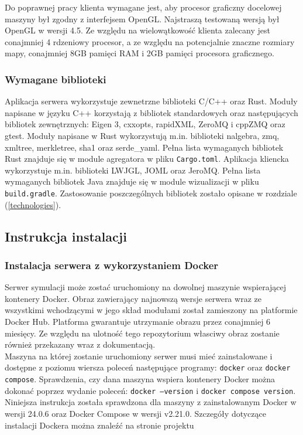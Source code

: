 \documentclass[15pt]{sprawozdanie}
\begin{document}
Do poprawnej pracy klienta wymagane jest, aby procesor graficzny docelowej maszyny był zgodny z interfejsem OpenGL. Najstraszą testowaną wersją był OpenGL w wersji 4.5. Ze względu na wielowątkowość klienta zalecany jest conajmniej 4 rdzeniowy procesor, a ze względu na potencjalnie znaczne rozmiary mapy, conajmniej 8GB pamięci RAM i 2GB pamięci procesora graficznego.

\subsubsection{Wymagane biblioteki} \label{libraries}

Aplikacja serwera wykorzystuje zewnetrzne biblioteki C/C++ oraz Rust. Moduły napisane w języku C++ korzystają z bibliotek standardowych oraz następujących bibliotek zewnętrznych: Eigen 3, cxxopts, rapidXML, ZeroMQ i cppZMQ oraz gtest.
Moduły napisane w Rust wykorzystują m.in. biblioteki nalgebra, zmq, xmltree, merkletree, sha1 oraz serde\_yaml. Pełna lista wymaganych bibliotek Rust znajduje się w module agregatora w pliku \texttt{Cargo.toml}.
Aplikacja kliencka wykorzystuje m.in. biblioteki LWJGL, JOML oraz JeroMQ. Pełna lista wymaganych bibliotek Java znajduje się w module wizualizacji w pliku \texttt{build.gradle}.  Zastosowanie poszczególnych bibliotek zostało opisane w rozdziale (\ref{technologies}).



\subsection{Instrukcja instalacji}
\subsubsection{Instalacja serwera z wykorzystaniem Docker} \label{docker_server}

Serwer symulacji może zostać uruchomiony na dowolnej maszynie wspierającej kontenery Docker. Obraz zawierający najnowszą wersje serwera wraz ze wszystkimi wchodzącymi w jego skład modułami został zamieszony na platformie Docker Hub. Platforma gwarantuje utrzymanie obrazu przez conajmniej 6 miesięcy. Ze względu na ulotność tego repozytorium własciwy obraz zostanie również przekazany wraz z dokumentacją.\\

Maszyna na której zostanie uruchomiony serwer musi mieć zainstalowane i dostępne z poziomu wiersza poleceń następujące programy: \texttt{docker} oraz \texttt{docker compose}. Sprawdzenia, czy dana maszyna wspiera kontenery Docker można dokonać poprzez wydanie poleceń: \texttt{docker --version} i \texttt{docker compose version}. Niniejsza instrukcja została sprawdzona dla maszyny z zainstalowanym Docker w wersji 24.0.6 oraz Docker Compose w wersji v2.21.0. Szczegóły dotyczące instalacji Dockera można znaleźć na stronie projektu \cite{docker}\\
\end{document}
